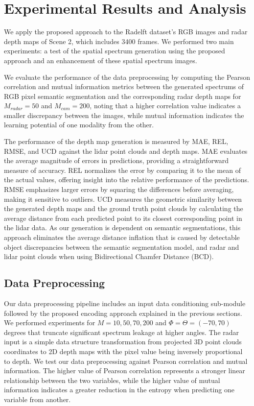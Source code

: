 \section{Experimental Results and Analysis}
We apply the proposed approach to the Radelft dataset's RGB images and radar depth maps of Scene 2, which includes 3400 frames. We performed two main experiments: a test of the spatial spectrum generation using the proposed approach and an enhancement of these spatial spectrum images. 
\par We evaluate the performance of the data preprocessing by computing the Pearson correlation and mutual information metrics between the generated spectrums of RGB pixel semantic segmentation and the corresponding radar depth maps for $M_{radar}=50$ and $M_{cam}=200$, noting that a higher correlation value indicates a smaller discrepancy between the images, while mutual information indicates the learning potential of one modality from the other.

The performance of the depth map generation is measured by MAE, REL, RMSE, and UCD against the lidar point clouds and depth maps. MAE evaluates the average magnitude of errors in predictions, providing a straightforward measure of accuracy. REL normalizes the error by comparing it to the mean of the actual values, offering insight into the relative performance of the predictions. RMSE emphasizes larger errors by squaring the differences before averaging, making it sensitive to outliers. UCD measures the geometric similarity between the generated depth maps and the ground truth point clouds by calculating the average distance from each predicted point to its closest corresponding point in the lidar data. As our generation is dependent on semantic segmentations, this approach eliminates the average distance inflation that is caused by detectable object discrepancies between the semantic segmentation model, and radar and lidar point clouds when using Bidirectional Chamfer Distance (BCD).

\subsection{Data Preprocessing}
Our data preprocessing pipeline includes an input data conditioning sub-module followed by the proposed encoding approach explained in the previous sections. We performed experiments for $M = 10, 50, 70, 200$ and $\Phi=\Theta=(-70,70)$ degrees that truncate significant spectrum leakage at higher angles. The radar input is a simple data structure transformation from projected 3D point clouds coordinates to 2D depth maps with the pixel value being inversely proportional to depth. We test our data preprocessing against Pearson correlation and mutual information. The higher value of Pearson correlation represents a stronger linear relationship between the two variables, while the higher value of mutual information indicates a greater reduction in the entropy when predicting one variable from another.

